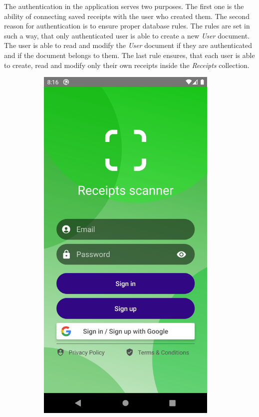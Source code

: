 \documentclass[
  digital, %
  table,   %
  oneside, %
  lof,     %
  lot,     %
]{fithesis3}
\newcommand\half{0.45}
\newcommand\subfigsize{0.95}
\begin{document}
The authentication in the application serves two purposes. The first one is the ability of connecting saved receipts with the user who created them. The second reason for authentication is to ensure proper database rules. The rules are set in such a way, that only authenticated user is able to create a new \textit{User} document. The user is able to read and modify the \textit{User} document if they are authenticated and if the document belongs to them. The last rule ensures, that each user is able to create, read and modify only their own receipts inside the \textit{Receipts} collection.

\begin{figure}
\centering
\begin{subfigure}[t]{\half\textwidth}
  \centering
  \includegraphics[width=\subfigsize\textwidth]{figures/screens/android/light/login_screen}

\end{subfigure}
\end{figure}
\end{document}
